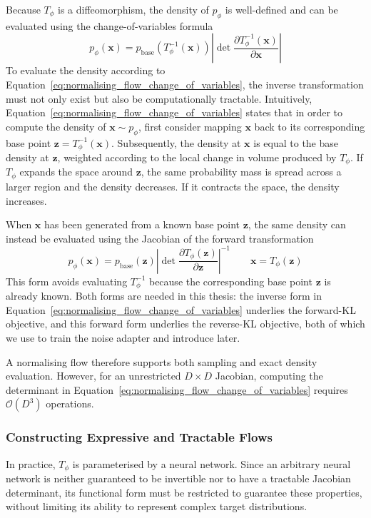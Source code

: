 \documentclass[12pt,a4paper]{report}
\begin{document}
Because $T_{\phi}$ is a diffeomorphism, the density of $p_{\phi}$ is well-defined and can be evaluated using the change-of-variables formula
\begin{equation}
p_{\phi}(\mathbf{x})
=
p_{\mathrm{base}}\left(
T_{\phi}^{-1}(\mathbf{x})
\right)
\left|
\det
\frac{
\partial T_{\phi}^{-1}(\mathbf{x})
}{
\partial \mathbf{x}
}
\right|
\label{eq:normalising_flow_change_of_variables}
\end{equation}
To evaluate the density according to Equation~\ref{eq:normalising_flow_change_of_variables}, the inverse transformation must not only exist but also be computationally tractable. Intuitively, Equation~\ref{eq:normalising_flow_change_of_variables} states that in order to compute the density of $\mathbf{x} \sim p_{\phi}$, first consider mapping $\mathbf{x}$ back to its corresponding base point $\mathbf{z}=T_{\phi}^{-1}(\mathbf{x})$. Subsequently, the density at $\mathbf{x}$ is equal to the base density at $\mathbf{z}$, weighted according to the local change in volume produced by $T_{\phi}$. If $T_{\phi}$ expands the space around $\mathbf{z}$, the same probability mass is spread across a larger region and the density decreases. If it contracts the space, the density increases.

When $\mathbf{x}$ has been generated from a known base point $\mathbf{z}$, the same density can instead be evaluated using the Jacobian of the forward transformation
\begin{equation}
p_{\phi}(\mathbf{x})
=
p_{\mathrm{base}}(\mathbf{z})
\left|
\det
\frac{
\partial T_{\phi}(\mathbf{z})
}{
\partial \mathbf{z}
}
\right|^{-1}
\qquad
\mathbf{x}
=
T_{\phi}(\mathbf{z})
\label{eq:normalising_flow_forward_change_of_variables}
\end{equation}
This form avoids evaluating $T_{\phi}^{-1}$ because the corresponding base point $\mathbf{z}$ is already known. Both forms are needed in this thesis: the inverse form in Equation~\ref{eq:normalising_flow_change_of_variables} underlies the forward-KL objective, and this forward form underlies the reverse-KL objective, both of which we use to train the noise adapter and introduce later. 

A normalising flow therefore supports both sampling and exact density evaluation. However, for an unrestricted $D\times D$ Jacobian, computing the determinant in Equation~\ref{eq:normalising_flow_change_of_variables} requires $\mathcal{O}(D^3)$ operations.

\subsubsection{Constructing Expressive and Tractable Flows}
\label{subsubsec:constructing_expressive_and_tractable_flows}
In practice, $T_{\phi}$ is parameterised by a neural network. Since an arbitrary neural network is neither guaranteed to be invertible nor to have a tractable Jacobian determinant, its functional form must be restricted to guarantee these properties, without limiting its ability to represent complex target distributions.
\end{document}
